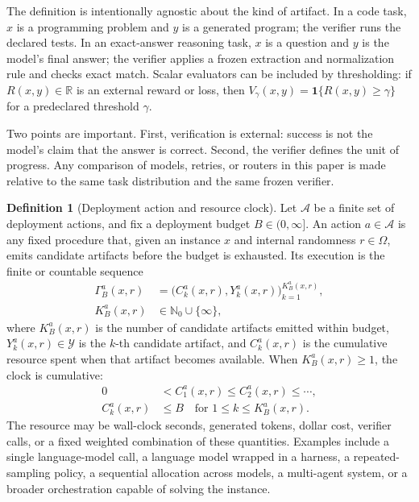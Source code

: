 \documentclass[10pt,twocolumn]{article}
\theoremstyle{definition}
\newtheorem{definition}{Definition}
\theoremstyle{plain}
\theoremstyle{remark}
\begin{document}
The definition is intentionally agnostic about the kind of artifact.  In a code
task, \(x\) is a programming problem and \(y\) is a generated program; the
verifier runs the declared tests.  In an exact-answer reasoning task, \(x\) is a
question and \(y\) is the model's final answer; the verifier applies a frozen
extraction and normalization rule and checks exact match.  Scalar evaluators can
be included by thresholding: if \(R(x,y)\in\mathbb R\) is an external reward or
loss, then \(V_\gamma(x,y)=\mathbf 1\{R(x,y)\ge\gamma\}\) for a predeclared
threshold \(\gamma\).

Two points are important.  First, verification is external: success is not the
model's claim that the answer is correct.  Second, the verifier defines the
unit of progress.  Any comparison of models, retries, or routers in this paper
is made relative to the same task distribution and the same frozen verifier.

\begin{definition}[Deployment action and resource clock]
\label{def:action-clock}
Let \(\mathcal A\) be a finite set of deployment actions, and fix a deployment
budget \(B\in(0,\infty]\).  An action \(a\in\mathcal A\) is any fixed
procedure that, given an instance \(x\) and internal randomness \(r\in\Omega\),
emits candidate artifacts before the budget is exhausted.  Its execution is the
finite or countable sequence
\[
    \begin{aligned}
    \Gamma^a_B(x,r)
    &=
    \bigl(C^a_k(x,r),Y^a_k(x,r)\bigr)_
    {k=1}^{K^a_B(x,r)},\\
    K^a_B(x,r)
    &\in\mathbb N_0\cup\{\infty\},
    \end{aligned}
\]
where \(K^a_B(x,r)\) is the number of candidate artifacts emitted within
budget, \(Y^a_k(x,r)\in\mathcal Y\) is the \(k\)-th candidate artifact, and
\(C^a_k(x,r)\) is the cumulative resource spent when that artifact becomes
available.  When \(K^a_B(x,r)\ge 1\), the clock is cumulative:
\[
    \begin{aligned}
    0&<C^a_1(x,r)\le C^a_2(x,r)\le\cdots,\\
    C^a_k(x,r)&\le B
    \quad\text{for }1\le k\le K^a_B(x,r).
    \end{aligned}
\]
The resource may be wall-clock seconds, generated tokens, dollar cost,
verifier calls, or a fixed weighted combination of these quantities.
Examples include a single language-model call, a language model wrapped in a
harness, a repeated-sampling policy, a sequential allocation across models, a
multi-agent system, or a broader orchestration capable of solving the instance.
\end{definition}
\end{document}
